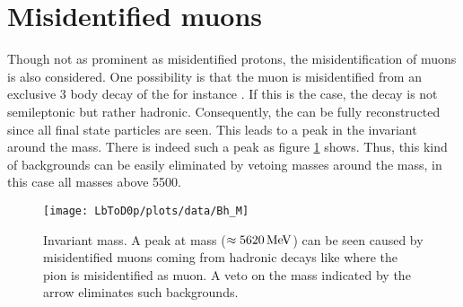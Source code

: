\section{Misidentified muons}
\label{sec:BKG_misIDmu}
Though not as prominent as misidentified protons, the misidentification of muons is also considered.
One possibility is that the muon is misidentified from an exclusive 3 body decay of the \Lb for instance \decay{\Lb}{\Dz\proton\pim}.
If this is the case, the decay is not semileptonic but rather hadronic.
Consequently, the \Lb can be fully reconstructed since all final state particles are seen.
This leads to a peak in the invariant \Dz\proton\mun around the \Lb mass.
There is indeed such a peak as figure \ref{fig:plot_D0pmuMass} shows.
Thus, this kind of backgrounds can be easily eliminated by vetoing \Dz\proton\muon masses around the \Lb mass, in this case all masses above 5500\mev.
\begin{figure}[tb]
	\centering
	\texttt{[image: LbToD0p/plots/data/Bh\_M]}
	\caption{Invariant \Dz\proton\mun mass. A peak at \Lb mass ($\approx 5620 \mathrm{\,Me\kern -0.1em V}$) can be seen caused by misidentified muons coming from hadronic decays like \decay{\Lb}{\Dz\proton\pi} where the pion is misidentified as muon. 
             A veto on the \Dz\proton\mun mass indicated by the arrow eliminates such backgrounds.}
	\label{fig:plot_D0pmuMass}
\end{figure}

